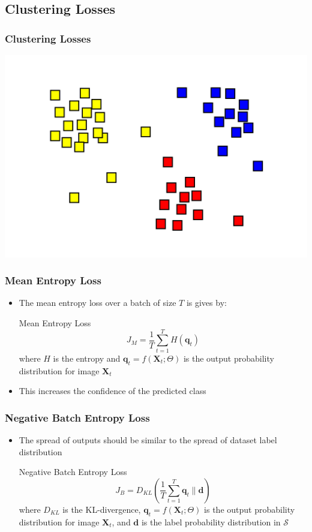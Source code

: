 \subsection{Clustering Losses}

\begin{frame}
	\frametitle{Clustering Losses}
	\includegraphics[scale=0.2, center]{images/clust1}
\end{frame}

\begin{frame}
	\frametitle{Mean Entropy Loss}
	\begin{itemize}
		\item The mean entropy loss over a batch of size $T$ is gives by:
			\begin{block}{Mean Entropy Loss}
				\begin{equation*}
					J_M = \frac{1}{T}\sum_{t=1}^{T}H(\mathbf{q}_t)
				\end{equation*}
				where $H$ is the entropy and $\mathbf{q}_t = f(\mathbf{X}_t; \Theta)$ is the output
				probability distribution for image $\mathbf{X}_t$
			\end{block}
		\item This increases the confidence of the predicted class
	\end{itemize}
\end{frame}

\begin{frame}
	\frametitle{Negative Batch Entropy Loss}
	\begin{itemize}
		\item The spread of outputs should be similar to the spread of dataset
			label distribution
			\begin{block}{Negative Batch Entropy Loss}
				\begin{equation*}
					\label{eq:nbel}
					J_B = D_{KL} (\frac{1}{T}\sum_{t=1}^{T}\mathbf{q}_t \lVert \mathbf{d})
				\end{equation*}
				where $D_{KL}$ is the KL-divergence, $\mathbf{q}_t = f(\mathbf{X}_t; \Theta)$ is
				the output probability distribution for image $\mathbf{X}_t$, and $\mathbf{d}$ is
				the label probability distribution in $\mathcal{S}$
			\end{block}
	\end{itemize}
\end{frame}

